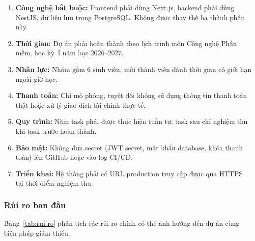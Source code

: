 \documentclass[a4paper]{article}
\begin{document}
\begin{enumerate}
    \item \textbf{Công nghệ bắt buộc:} Frontend phải dùng Next.js, backend phải dùng NestJS, dữ liệu lưu trong PostgreSQL. Không được thay thế ba thành phần này.
    \item \textbf{Thời gian:} Dự án phải hoàn thành theo lịch trình môn Công nghệ Phần mềm, học kỳ~I năm học 2026--2027.
    \item \textbf{Nhân lực:} Nhóm gồm 6 sinh viên, mỗi thành viên dành thời gian có giới hạn ngoài giờ học.
    \item \textbf{Thanh toán:} Chỉ mô phỏng, tuyệt đối không sử dụng thông tin thanh toán thật hoặc xử lý giao dịch tài chính thực tế.
    \item \textbf{Quy trình:} Năm task phải được thực hiện tuần tự; task sau chỉ nghiệm thu khi task trước hoàn thành.
    \item \textbf{Bảo mật:} Không đưa secret (JWT secret, mật khẩu database, khóa thanh toán) lên GitHub hoặc vào log CI/CD.
    \item \textbf{Triển khai:} Hệ thống phải có URL production truy cập được qua HTTPS tại thời điểm nghiệm thu.
\end{enumerate}

\subsubsection{Rủi ro ban đầu}

Bảng~\ref{tab:rui-ro} phân tích các rủi ro chính có thể ảnh hưởng đến dự án cùng biện pháp giảm thiểu.
\end{document}
